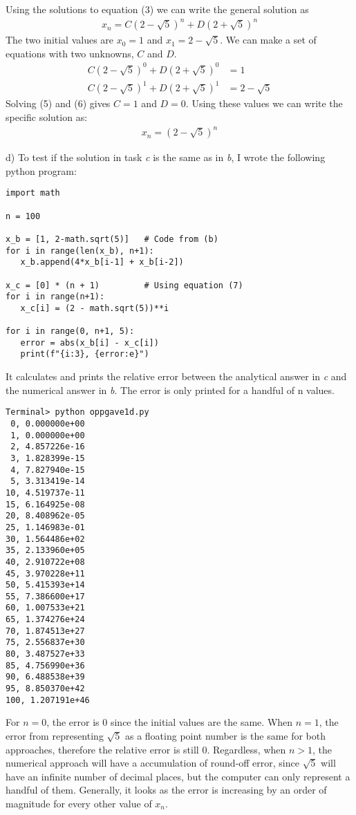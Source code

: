\documentclass[11pt,
				a4paper,
				article,
				oneside,
				oldfontcommands]{memoir}
\begin{document}
Using the solutions to equation (3) we can write the general solution as
\begin{align}
	x_n = C(2-\sqrt{5})^n + D(2+\sqrt{5})^n
\end{align}
The two initial values are $x_0 = 1$ and $x_1 = 2 - \sqrt{5}$. We can make a set of equations with two unknowns, $C$ and $D$. 
\begin{align}
	C(2-\sqrt{5})^0 + D(2+\sqrt{5})^0 &= 1 \\
	C(2-\sqrt{5})^1 + D(2+\sqrt{5})^1 &= 2 - \sqrt{5}
\end{align}
Solving (5) and (6) gives $C = 1$ and $D = 0$. Using these values we can write the specific solution as:
\begin{align}
	x_n = (2-\sqrt{5})^n
\end{align}

d) To test if the solution in task \textit{c} is the same as in \textit{b}, I wrote the following python program:

\begin{lstlisting}
import math

n = 100

x_b = [1, 2-math.sqrt(5)]  	# Code from (b)
for i in range(len(x_b), n+1):
   x_b.append(4*x_b[i-1] + x_b[i-2])

x_c = [0] * (n + 1)  		# Using equation (7)
for i in range(n+1):
   x_c[i] = (2 - math.sqrt(5))**i

for i in range(0, n+1, 5):
   error = abs(x_b[i] - x_c[i])
   print(f"{i:3}, {error:e}")
\end{lstlisting}

It calculates and prints the relative error between the analytical answer in \textit{c} and the numerical answer in \textit{b}. The error is only printed for a handful of n values.

\begin{lstlisting}
Terminal> python oppgave1d.py
 0, 0.000000e+00
 1, 0.000000e+00
 2, 4.857226e-16
 3, 1.828399e-15
 4, 7.827940e-15
 5, 3.313419e-14
10, 4.519737e-11
15, 6.164925e-08
20, 8.408962e-05
25, 1.146983e-01
30, 1.564486e+02
35, 2.133960e+05
40, 2.910722e+08
45, 3.970228e+11
50, 5.415393e+14
55, 7.386600e+17
60, 1.007533e+21
65, 1.374276e+24
70, 1.874513e+27
75, 2.556837e+30
80, 3.487527e+33
85, 4.756990e+36
90, 6.488538e+39
95, 8.850370e+42
100, 1.207191e+46
\end{lstlisting}

For $n=0$, the error is 0 since the initial values are the same. When $n=1$, the error from representing $\sqrt{5}$ as a floating point number is the same for both approaches, therefore the relative error is still 0. Regardless, when $n>1$, the numerical approach will have a accumulation of round-off error, since $\sqrt{5}$ will have an infinite number of decimal places, but the computer can only represent a handful of them. Generally, it looks as the error is increasing by an order of magnitude for every other value of $x_n$.
\end{document}
